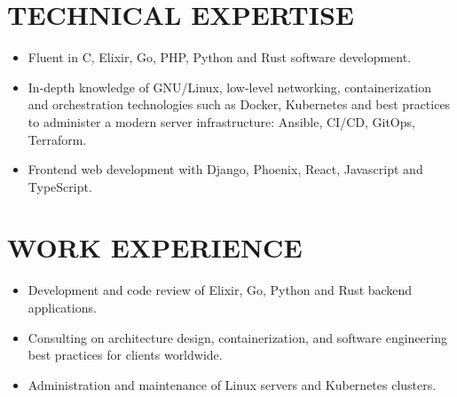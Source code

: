 \documentclass{resume}
\begin{document}

\section{TECHNICAL EXPERTISE}

\begin{itemize}
\item Fluent in C, Elixir, Go, PHP, Python and Rust software development.
\item In-depth knowledge of GNU/Linux, low-level networking, containerization and orchestration technologies such as Docker, Kubernetes and best practices to administer a modern server infrastructure: Ansible, CI/CD, GitOps, Terraform.
\item Frontend web development with Django, Phoenix, React, Javascript and TypeScript.
\end{itemize}

\section{WORK EXPERIENCE}


\begin{itemize}
\item Development and code review of Elixir, Go, Python and Rust backend applications.
\item Consulting on architecture design, containerization, and software engineering best practices for clients worldwide.
\item Administration and maintenance of Linux servers and Kubernetes clusters.
\end{itemize}


%

\end{document}
